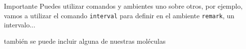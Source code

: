 \documentclass[10pt,a4paper]{article}
\begin{document}
\begin{remark}{Importante}
	Puedes utilizar comandos y ambientes uno sobre otros, por ejemplo, vamos a utilizar el comando \texttt{interval} para definir en el ambiente \texttt{remark}, un intervalo...
	\begin{center}
	\end{center}
	también se puede incluir alguna de nuestras moléculas
	\begin{center}
	\end{center}
\end{remark}
\end{document}
